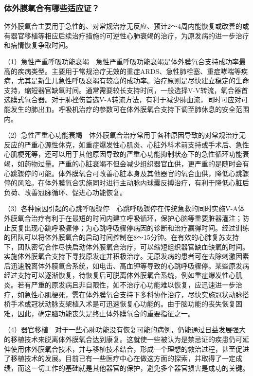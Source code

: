 \subsubsection{体外膜氧合有哪些适应证？}

体外膜氧合主要用于急性的、对常规治疗无反应、预计2～4周内能恢复或改善的或有器官移植等相应后续治疗措施的可逆性心肺衰竭的治疗，为原发病的进一步治疗和病情恢复争取时间。

（1）急性严重呼吸功能衰竭　急性严重呼吸功能衰竭是体外膜氧合支持成功率最高的疾病类型。主要用于常规治疗无效的重症ARDS、急性肺栓塞、重症哮喘等疾病，尤其是新生儿急性呼吸衰竭有较高的成功率。治疗原则是尽快建立稳定的生命支持，缩短器官缺氧时间。通常需要较长支持时间，一般选择V-V转流，氧合器首选膜式氧合器。对于肺挫伤首选V-A转流方法，有利于减少肺血流，同时可应对可能发生的肺出血。呼吸机治疗的参数可在体外膜氧合支持下调至肺休息的安全范围内。

（2）急性严重心功能衰竭　体外膜氧合治疗常用于各种原因导致的对常规治疗无反应的严重心源性休克，如重症爆发性心肌炎、心脏外科术前支持或手术后、急性心肌梗死等，还可以用于其他原因导致的严重心功能抑制状态下的急性循环功能衰竭，如药物过量。严重的心脏衰竭不但会减少组织器官血供，更严重的是随时会有心跳骤停的可能。体外膜氧合可改善心脏本身及其他器官的氧合血供，降低心跳骤停的风险。在体外膜氧合实施同时进行主动脉内球囊反搏治疗，有利于降低心脏后负荷、改善冠脉循环、促进心功能恢复。

（3）各种原因引起的心跳呼吸骤停　心跳呼吸骤停在传统急救的同时实施V-A体外膜氧合治疗有利于在最短的时间内建立呼吸循环，保护心脑等重要脏器灌注；防止反复出现心跳呼吸骤停；为心跳呼吸骤停病因的诊断和治疗赢得时间。经过训练的团队可以将体外膜氧合的启动时间控制在8～15分钟。在有效的心肺复苏支持下，团队密切合作尽快启动体外膜氧合治疗，可以缩短组织器官缺血缺氧的时间。实施体外膜氧合支持下寻找原发症并积极治疗。无原发病的患者可在去除刺激因素后迅速脱离体外膜氧合系统，如电击、高血钾等导致的心跳呼吸骤停。某些原发病经过支持可以逐渐恢复，待恢复后可脱离体外膜氧合系统，例如重症爆发性心肌炎。若有严重的原发病且非自限性，如不治疗心功能难以恢复，应迅速进一步治疗，如急性心肌梗死，需在体外膜氧合支持下多科协作治疗，尽快实施冠状动脉搭桥手术或冠状动脉支架植入术是可迅速恢复心功能的。由于脑功能的丧失恢复困难，因此，确定脑功能丧失是终止体外膜氧合的重要指征之一。

（4）器官移植　对于一些心肺功能没有恢复可能的病例，仍能通过日益发展强大的移植技术来脱离体外膜氧合达到康复。这就使一些被认为是禁忌证的疾患仍可延伸使用体外膜氧合技术，并与移植技术结合，形成一个理想的救治过程，甚至促进了移植技术的发展。目前已有一些医疗中心在做这方面的探索，并取得了一定成绩，而这一切工作的基础就是其他器官的保护，避免多个器官损害是成功的关键。

